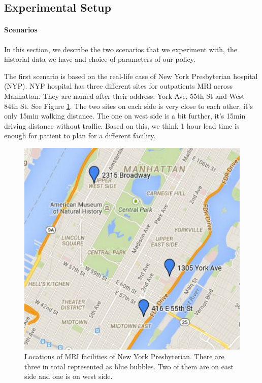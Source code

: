 \subsection{Experimental Setup}

\paragraph{Scenarios}

In this section, we describe the two scenarios that we experiment with, the historial data we have and choice of parameters of our policy.

The first scenario is based on the real-life case of New York Presbyterian hospital (NYP). NYP hospital has three different sites for outpatients MRI across Manhattan. They are named after their address: York Ave, 55th St and West 84th St. See Figure \ref{fig:site}. The two sites on each side is very close to each other, it's only 15min walking distance. The one on west side is a bit further, it's 15min driving distance without traffic.
Based on this, we think 1 hour lead time is enough for patient to
plan for a different facility.

\begin{figure}
\centering
\includegraphics[scale=.6]{chap3/numeric/pic/site.pdf}
\caption{Locations of MRI facilities of New York Presbyterian. There
are three in total represented as blue bubbles. Two of them are on
east side and one is on west side.}
\label{fig:site}
\end{figure}

